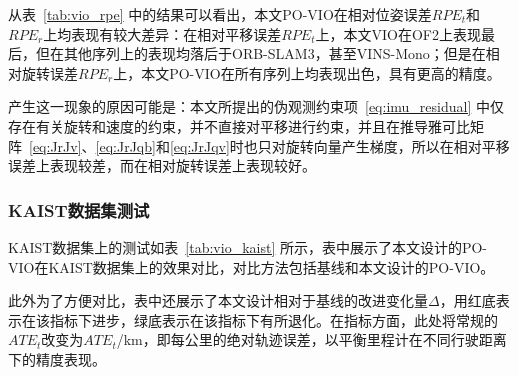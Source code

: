从表~\ref{tab:vio_rpe} 中的结果可以看出，本文PO-VIO在相对位姿误差$RPE_t$和$RPE_r$上均表现有较大差异：在相对平移误差$RPE_t$上，本文VIO在OF2上表现最后，但在其他序列上的表现均落后于ORB-SLAM3，甚至VINS-Mono；但是在相对旋转误差$RPE_r$上，本文PO-VIO在所有序列上均表现出色，具有更高的精度。

产生这一现象的原因可能是：本文所提出的伪观测约束项~\eqref{eq:imu_residual} 中仅存在有关旋转和速度的约束，并不直接对平移进行约束，并且在推导雅可比矩阵~\eqref{eq:JrJv}、\eqref{eq:JrJqb}和\eqref{eq:JrJqv}时也只对旋转向量产生梯度，所以在相对平移误差上表现较差，而在相对旋转误差上表现较好。

\subsubsection{KAIST数据集测试}

KAIST数据集上的测试如表~\ref{tab:vio_kaist} 所示，表中展示了本文设计的PO-VIO在KAIST数据集上的效果对比，对比方法包括基线\cite{qin2018vins}和本文设计的PO-VIO。

此外为了方便对比，表中还展示了本文设计相对于基线的改进变化量$\Delta$，用红底表示在该指标下进步，绿底表示在该指标下有所退化。在指标方面，此处将常规的$ATE_t$改变为$ATE_t$/km，即每公里的绝对轨迹误差，以平衡里程计在不同行驶距离下的精度表现。

